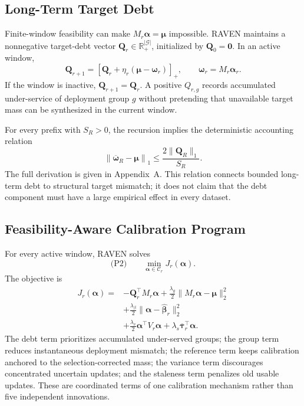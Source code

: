 \documentclass[letterpaper,journal]{IEEEtran}
\begin{document}
\subsection{Long-Term Target Debt}
\label{subsec:debt}

Finite-window feasibility can make
$M_r\boldsymbol\alpha=\boldsymbol\mu$ impossible.  RAVEN maintains a
nonnegative target-debt vector
$\mathbf{Q}_r\in\mathbb{R}^{|\mathcal{G}|}_+$, initialized by
$\mathbf{Q}_0=\mathbf{0}$.  In an active window,
\begin{equation}
 \mathbf{Q}_{r+1}
 =
 \left[
 \mathbf{Q}_r
 +
 \eta_r
 \left(
 \boldsymbol\mu-\boldsymbol\omega_r
 \right)
 \right]_+,
 \qquad
 \boldsymbol\omega_r=M_r\boldsymbol\alpha_r.
 \label{eq:debt_update}
\end{equation}
If the window is inactive, $\mathbf{Q}_{r+1}=\mathbf{Q}_r$.  A positive
$Q_{r,g}$ records accumulated under-service of deployment group $g$ without
pretending that unavailable target mass can be synthesized in the current
window.

For every prefix with $S_R>0$, the recursion implies the deterministic
accounting relation
\begin{equation}
 \left\|
 \overline{\boldsymbol\omega}_R-\boldsymbol\mu
 \right\|_1
 \le
 \frac{
 2\|\mathbf{Q}_R\|_1
 }{S_R}.
 \label{eq:debt_bound}
\end{equation}
The full derivation is given in Appendix~A.  This relation connects bounded
long-term debt to structural target mismatch; it does not claim that the debt
component must have a large empirical effect in every dataset.

\subsection{Feasibility-Aware Calibration Program}
\label{subsec:P2}

For every active window, RAVEN solves
\begin{equation}
 \text{(P2)}\qquad
 \min_{\boldsymbol\alpha\in\mathcal{C}_r}
 J_r(\boldsymbol\alpha).
\label{eq:P2}
\end{equation}
The objective is
\begin{align}
 J_r(\boldsymbol\alpha)
 ={}&-\mathbf{Q}_r^{\top}M_r\boldsymbol\alpha
 +\frac{\lambda_g}{2}
 \|M_r\boldsymbol\alpha-\boldsymbol\mu\|_2^2
 \nonumber\\
 &+\frac{\lambda_{\beta}}{2}
 \|\boldsymbol\alpha-\widehat{\boldsymbol\beta}_r\|_2^2
 \nonumber\\
 &+\frac{\lambda_v}{2}
 \boldsymbol\alpha^{\top}V_r\boldsymbol\alpha
 +\lambda_s\overline{\boldsymbol\tau}_r^{\top}\boldsymbol\alpha.
\label{eq:P2_objective}
\end{align}
The debt term prioritizes accumulated under-served groups; the group term
reduces instantaneous deployment mismatch; the reference term keeps calibration
anchored to the selection-corrected mass; the variance term discourages
concentrated uncertain updates; and the staleness term penalizes old usable
updates.  These are coordinated terms of one calibration mechanism rather than
five independent innovations.
\end{document}
